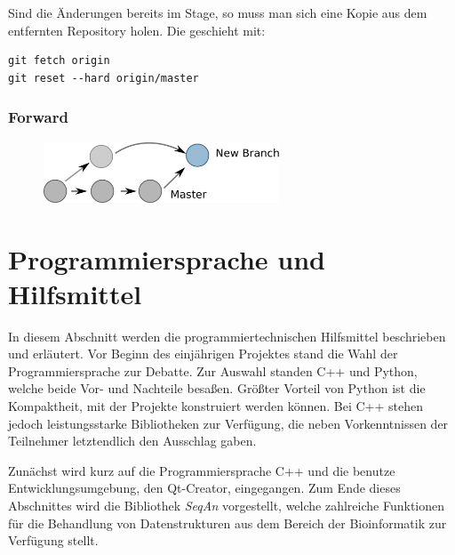 Sind die Änderungen bereits im Stage, so muss man sich eine Kopie aus dem entfernten Repository holen.
Die geschieht mit:
\begin{verbatim}
git fetch origin
git reset --hard origin/master
\end{verbatim}

\subsubsection{Forward}

\begin{figure}[htb]
\begin{center}
\includegraphics[width=7cm]{bilder/merge.pdf}
\end{center} 
\end{figure}
\newpage

\section{Programmiersprache und Hilfsmittel}

In diesem Abschnitt werden die programmiertechnischen Hilfsmittel beschrieben und erläutert.
Vor Beginn des einjährigen Projektes stand die Wahl der Programmiersprache zur Debatte.
Zur Auswahl standen C++ und Python, welche beide Vor- und Nachteile besaßen.
Größter Vorteil von Python ist die Kompaktheit, mit der Projekte konstruiert werden können.
Bei C++ stehen jedoch leistungsstarke Bibliotheken zur Verfügung, die neben Vorkenntnissen der Teilnehmer letztendlich den Ausschlag gaben.

Zunächst wird kurz auf die Programmiersprache C++ und die benutze Entwicklungsumgebung, den Qt-Creator, eingegangen.
Zum Ende dieses Abschnittes wird die Bibliothek \textit{SeqAn} vorgestellt, welche zahlreiche Funktionen für die Behandlung von Datenstrukturen aus dem Bereich der Bioinformatik zur Verfügung stellt.
